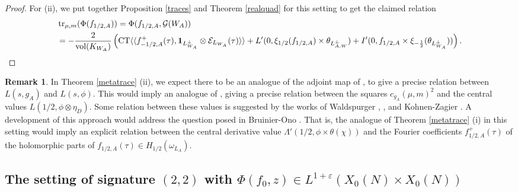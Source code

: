 \documentclass{amsart}
\theoremstyle{definition}
\theoremstyle{definition}
\theoremstyle{definition}
\newtheorem{remark}[theorem]{Remark}
\begin{document}
\begin{proof}
For (ii), we put together Proposition \ref{traces} and Theorem \ref{realquad} for this setting to get the claimed relation
\begin{equation*}\begin{aligned} &\operatorname{tr}_{\mu, m}(\Phi(f_{1/2, A})) 
= \Phi(f_{1/2, A}, \mathcal{G}(W_A)) \\ &= - \frac{2}{\operatorname{vol}(K_{W_A})} 
\left(  \operatorname{CT} \langle \langle f_{-1/2, A}^+(\tau), {\bf{1}}_{L_{W_A}^{\perp}} \otimes \mathcal{E}_{L_{W_A}}(\tau) \rangle \rangle
+ L'(0, \xi_{1/2}(f_{1/2, A}) \times \theta_{L_{A, W}^{\perp}}) + I'(0, f_{1/2, A} \times \xi_{-\frac{1}{2}}(\theta_{L_{W_A}^{\perp}}) )
\right). \end{aligned}\end{equation*} \end{proof}

\begin{remark} 

In Theorem \ref{metatrace} (ii), we expect there to be an analogue of the adjoint map of \cite[$\S$II.4]{GKZ}, 
to give a precise relation between $L(s, g_A)$ and $L(s, \phi)$. 
This would imply an analogue of \cite[$\S$II.4, Corollary 1]{GKZ}, giving a precise relation between the squares $c_{g_A}(\mu, m)^2$ and the central values $L(1/2, \phi \otimes \eta_D)$.
Some relation between these values is suggested by the works of Waldspurger \cite{Wa-de}, \cite{Wa-CdS}, and Kohnen-Zagier \cite{KZ}. 
A development of this approach would address the question posed in Bruinier-Ono \cite[Remark 4]{BO}. That is, the analogue of Theorem \ref{metatrace} (i)
in this setting would imply an explicit relation between the central derivative value $\Lambda'(1/2, \phi \times \theta(\chi))$ and the Fourier coefficients $f_{1/2, A}^+(\tau)$ 
of the holomorphic parts of $f_{1/2, A}(\tau) \in H_{1/2}(\omega_{L_A})$. \end{remark}

\subsection{The setting of signature $(2,2)$ with $\Phi(f_0, z) \in L^{1 + \varepsilon}(X_0(N) \times X_0(N))$}
\end{document}
